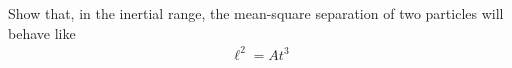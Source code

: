   Show that, in the inertial range, the mean-square separation of two
particles will behave like 
\begin{align}
\ell^2 = A t^3
\end{align}
